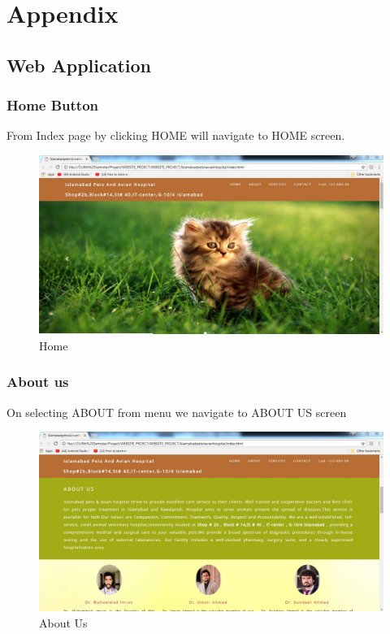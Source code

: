 \chapter{Appendix} \label{ap:appendix2}

\section{Web Application}
\subsection{Home Button}
From Index page by clicking HOME will navigate to HOME screen.
\begin{figure}[H]
  \centering
    \includegraphics[scale=0.4]{appbone}
      \caption{Home}
\end{figure}

\newpage
\subsection{About us}
On selecting ABOUT from menu we navigate to ABOUT US screen
\begin{figure}[H]
  \centering
    \includegraphics[scale=0.4]{aboutusapp}
     \caption{About Us}
\end{figure}


